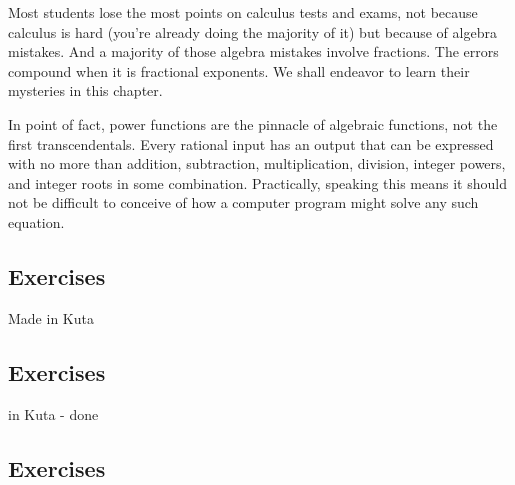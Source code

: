 

Most students lose the most points on calculus tests and exams, not because
calculus is hard (you're already doing the majority of it) but because of algebra mistakes.
And a majority of those algebra mistakes involve fractions.  The errors compound
when it is fractional exponents.  We shall endeavor to learn their mysteries in this chapter.

In point of fact, power functions are the pinnacle of algebraic functions, not the first
transcendentals.  Every rational input has an output that can be expressed with no 
more than addition, subtraction, multiplication, division, integer powers, and integer
roots in some combination.  Practically, speaking this means it should not be difficult
to conceive of how a computer program might solve any such equation.

\newpage
\chapterminitoc

\newpage
{}
\newpage

\newpage
\subsection{Exercises}
Made in Kuta
\newpage



\newpage
{}
\newpage

\newpage
\subsection{Exercises}
in Kuta - done



\newpage
{}
\newpage

\newpage
\subsection{Exercises}
\noindent{}
\newpage
\noindent{}
\newpage
\noindent{}
\newpage
\noindent{}



